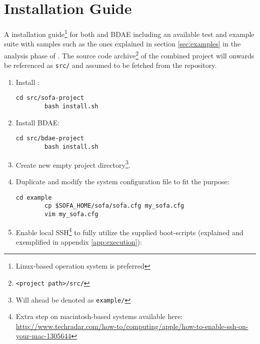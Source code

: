 \chapter{Installation Guide} \label{app:installation}

A installation guide\footnote{Linux-based operation system is preferred} for both \CodeName and BDAE including an available test and example suite with samples such as the ones explained in section \ref{sec:examples} in the analysis phase of \CodeName. The source code archive\footnote{\texttt{<project path>/src/}} of the combined project will onwards be referenced as \texttt{src/} and assumed to be fetched from the repository.

\begin{enumerate}
	\item Install \CodeName:
	
	\begin{lstlisting}[numbers=none, backgroundcolor=\color{sourcebackground}, rulecolor=\color{sourcebackground}, framextopmargin=5pt, framexbottommargin=5pt, frame=tb, xrightmargin=15pt]
		cd src/sofa-project
		bash install.sh
	\end{lstlisting}
	\vspace*{-6mm}
	\item Install BDAE:
	
	\begin{lstlisting}[numbers=none, backgroundcolor=\color{sourcebackground}, rulecolor=\color{sourcebackground}, framextopmargin=5pt, framexbottommargin=5pt, frame=tb, xrightmargin=15pt]
		cd src/bdae-project
		bash install.sh
	\end{lstlisting}
	\vspace*{-6mm}
	\item Create new empty project directory\footnote{Will ahead be denoted as \texttt{example/}}.
	\item Duplicate and modify the system configuration file to fit the purpose:
	
	\begin{lstlisting}[numbers=none, backgroundcolor=\color{sourcebackground}, rulecolor=\color{sourcebackground}, framextopmargin=5pt, framexbottommargin=5pt, frame=tb, xrightmargin=15pt]
		cd example
		cp $SOFA_HOME/sofa/sofa.cfg my_sofa.cfg
		vim my_sofa.cfg
	\end{lstlisting}
	
	\item Enable local SSH\footnote{Extra step on macintosh-based systems available here: \url{http://www.techradar.com/how-to/computing/apple/how-to-enable-ssh-on-your-mac-1305644}} to fully utilize the supplied boot-scripts (explained and exemplified in appendix \ref{app:execution}):
	

\end{enumerate}
